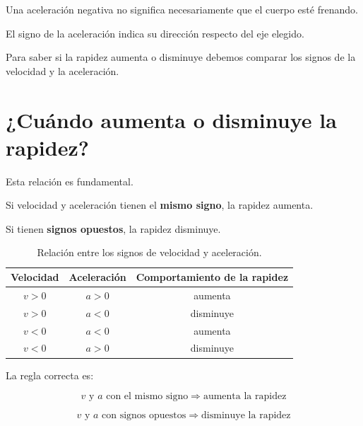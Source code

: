 \begin{advertencia}
Una aceleración negativa no significa necesariamente que el cuerpo esté
frenando.

El signo de la aceleración indica su dirección respecto del eje elegido.

Para saber si la rapidez aumenta o disminuye debemos comparar los signos de
la velocidad y la aceleración.
\end{advertencia}


\section{¿Cuándo aumenta o disminuye la rapidez?}

Esta relación es fundamental.

Si velocidad y aceleración tienen el \textbf{mismo signo}, la rapidez
aumenta.

Si tienen \textbf{signos opuestos}, la rapidez disminuye.

\begin{table}[H]
    \centering

    \caption{Relación entre los signos de velocidad y aceleración.}

    \begin{tabular}{ccc}
        \toprule
        Velocidad & Aceleración & Comportamiento de la rapidez \\
        \midrule
        \(v>0\) & \(a>0\) & aumenta \\
        \(v>0\) & \(a<0\) & disminuye \\
        \(v<0\) & \(a<0\) & aumenta \\
        \(v<0\) & \(a>0\) & disminuye \\
        \bottomrule
    \end{tabular}
\end{table}

\begin{idea}
La regla correcta es:

\[
\boxed{
v\text{ y }a\text{ con el mismo signo}
\Longrightarrow
\text{aumenta la rapidez}
}
\]

\[
\boxed{
v\text{ y }a\text{ con signos opuestos}
\Longrightarrow
\text{disminuye la rapidez}
}
\]
\end{idea}


